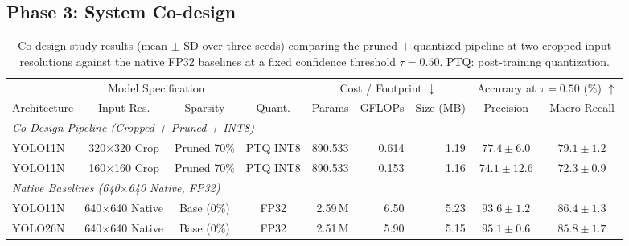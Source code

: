 \documentclass[conference]{IEEEtran}
\begin{document}
\subsection{Phase 3: System Co-design}
\begin{table}[!t]
\renewcommand{\arraystretch}{1.15}
\caption{Co-design study results (mean $\pm$ SD over three seeds) comparing the pruned + quantized pipeline at two cropped input resolutions against the native FP32 baselines at a fixed confidence threshold $\tau = 0.50$. PTQ: post-training quantization.}
\label{tab:codesign_study}
\centering
\scriptsize
\setlength{\tabcolsep}{3.2pt}
\begin{tabular}{l c c c r r r cc}
\toprule
\multicolumn{4}{c}{Model Specification} 
& \multicolumn{3}{c}{Cost / Footprint $\downarrow$} 
& \multicolumn{2}{c}{Accuracy at $\tau = 0.50$ (\%) $\uparrow$} \\
\cmidrule(lr){1-4}
\cmidrule(lr){5-7}
\cmidrule(lr){8-9}
Architecture & Input Res. & Sparsity & Quant. 
& Params & GFLOPs & Size (MB) 
& Precision & Macro-Recall \\
\midrule
\multicolumn{9}{l}{\textit{Co-Design Pipeline (Cropped + Pruned + INT8)}} \\
YOLO11N & 320$\times$320 Crop & Pruned 70\% & PTQ INT8 
& 890{,}533 & 0.614 & 1.19 
& $77.4 \pm 6.0$ & $79.1 \pm 1.2$ \\
YOLO11N & 160$\times$160 Crop & Pruned 70\% & PTQ INT8 
& 890{,}533 & 0.153 & 1.16 
& $74.1 \pm 12.6$ & $72.3 \pm 0.9$ \\
\midrule
\multicolumn{9}{l}{\textit{Native Baselines (640$\times$640 Native, FP32)}} \\
YOLO11N & 640$\times$640 Native & Base (0\%) & FP32 
& 2.59\,M & 6.50 & 5.23 
& $93.6 \pm 1.2$ & $86.4 \pm 1.3$ \\
YOLO26N & 640$\times$640 Native & Base (0\%) & FP32 
& 2.51\,M & 5.90 & 5.15 
& $95.1 \pm 0.6$ & $85.8 \pm 1.7$ \\
\bottomrule
\end{tabular}
\end{table}
\end{document}
